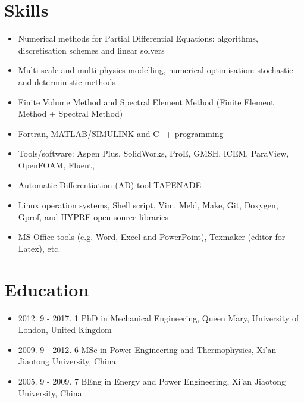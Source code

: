 \documentclass[letterpaper]{article}
\begin{document}
\section*{Skills}
\vspace{-10pt}
\begin{itemize}
\item Numerical methods for Partial Differential Equations: algorithms, discretisation schemes and linear solvers
\item Multi-scale and multi-physics modelling, numerical optimisation: stochastic and deterministic methods
\item Finite Volume Method and Spectral Element Method (Finite Element Method + Spectral Method)
\item Fortran, MATLAB/SIMULINK and C++ programming
\item Tools/software: Aspen Plus, SolidWorks, ProE, GMSH, ICEM, ParaView, OpenFOAM, Fluent, 
\item Automatic Differentiation (AD) tool TAPENADE
\item Linux operation systems, Shell script, Vim, Meld, Make, Git, Doxygen, Gprof, and HYPRE open source libraries
\item MS Office tools (e.g. Word, Excel and PowerPoint), Texmaker (editor for Latex), etc.
\end{itemize}

\vspace{-12pt}
\section*{Education}
\vspace{-10pt}
\begin{itemize}
  \item 2012. 9 - 2017. 1 \hspace{2pt} PhD in Mechanical Engineering, Queen Mary, University of London, United Kingdom
  \item 2009. 9 - 2012. 6 \hspace{2pt} MSc in Power Engineering and Thermophysics, Xi’an Jiaotong University, China
  \item 2005. 9 - 2009. 7 \hspace{2pt} BEng in Energy and Power Engineering, Xi’an Jiaotong University, China
\end{itemize}
\end{document}
